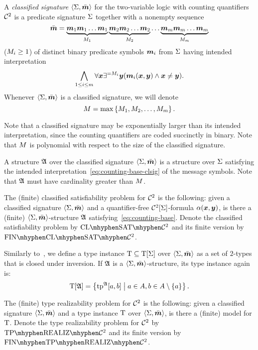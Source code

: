 \begin{definition}
A \emph{classified signature} $\left\langle \mathrm{\Sigma},\bar{\bm{m}} \right\rangle$ for the two-variable logic with
counting quantifiers $\mathcal{C}^{2}$ is a predicate signature $\mathrm{\Sigma}$ together with a
nonempty sequence
\[
\sms = \underbrace{\smm1\smm1\dots\smm1}_{\nMM1}
\underbrace{\smm2\smm2\dots\smm2}_{\nMM2}
\dots
\underbrace{\smm\nm\smm\nm\dots\smm\nm}_{\nMM\nm}
\]
($M_{i}\geq1$) of distinct binary predicate symbols $\bm{m}_{i}$ from $\mathrm{\Sigma}$
having intended interpretation
\begin{equation}\label{eq:counting-base-clsig}
\bigwedge_{1\leq\ii\leq\nm}\forall\xx\existseq{\nMM\ii}\yy
(\smm\ii(\xx,\yy)\land\xx\neq\yy).
\end{equation}
Whenever $\left\langle \mathrm{\Sigma},\bar{\bm{m}} \right\rangle$ is a classified signature, we will denote
\[
  M = \max\left\{M_{1},M_{2},\dots,M_{m}\right\}.
\]
\end{definition}
Note that a classified signature may be exponentially larger than its intended
interpretation, since the counting quantifiers are coded succinctly in binary.
Note that $M$ is polynomial with respect to the size of the classified
signature.
\begin{definition}
A structure $\mathfrak{A}$ over the classified signature $\left\langle \mathrm{\Sigma},\bar{\bm{m}} \right\rangle$ is a
structure over $\mathrm{\Sigma}$ satisfying the intended
interpretation~\cref{eq:counting-base-clsig} of the message symbols.
Note that $\mathfrak{A}$ must have cardinality greater than $M$.
\end{definition}
\begin{definition}
The (finite) classified satisfiability problem for $\mathcal{C}^{2}$ is the following:
given a classified signature $\left\langle \mathrm{\Sigma},\bar{\bm{m}} \right\rangle$ and a quantifier-free
$\mathcal{C}^{2}[\mathrm{\Sigma}]$-formula $\alpha(\bm{x},\bm{y})$, is there a (finite)
$\left\langle \mathrm{\Sigma},\bar{\bm{m}} \right\rangle$-structure $\mathfrak{A}$ satisfying~\ref{eq:counting-base}.
Denote the classified satisfiability problem by $\ClSat{\vFoc2}$ and its finite
version by $\FinClSat{\vFoc2}$.
\end{definition}

Similarly to~, we define a type instance
$\mathrm{T}\subseteq\mathrm{T}[\mathrm{\Sigma}]$ over $\left\langle \mathrm{\Sigma},\bar{\bm{m}} \right\rangle$ as a set of $2$-types that is
closed under inversion.
If $\mathfrak{A}$ is a $\left\langle \mathrm{\Sigma},\bar{\bm{m}} \right\rangle$-structure, its type instance again is:
\[
  \mathrm{T}[\mathfrak{A}] = \left\{\operatorname{tp}^{\mathfrak{A}}[a,b]\mathrel{}\middle|\mathrel{}a\in A,b\in A\setminus\left\{a\right\}\right\}.
\]

\begin{definition}
The (finite) type realizability problem for $\mathcal{C}^{2}$ is the following:
given a classified signature $\left\langle \mathrm{\Sigma},\bar{\bm{m}} \right\rangle$ and a type instance $\mathrm{T}$ over
$\left\langle \mathrm{\Sigma},\bar{\bm{m}} \right\rangle$, is there a (finite) model for $\mathrm{T}$.
Denote the type realizability problem for $\mathcal{C}^{2}$ by $\Real{\vFoc2}$
and its finite version by $\FinReal{\vFoc2}$.
\end{definition}


